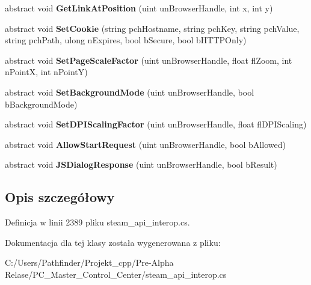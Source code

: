\begin{DoxyCompactItemize}
abstract void {\bfseries Get\+Link\+At\+Position} (uint un\+Browser\+Handle, int x, int y)
\item 
\mbox{\label{class_valve_1_1_steamworks_1_1_i_steam_h_t_m_l_surface_a3cbf4e16e3edc461eab6a73a989d4d03}} 
abstract void {\bfseries Set\+Cookie} (string pch\+Hostname, string pch\+Key, string pch\+Value, string pch\+Path, ulong n\+Expires, bool b\+Secure, bool b\+H\+T\+T\+P\+Only)
\item 
\mbox{\label{class_valve_1_1_steamworks_1_1_i_steam_h_t_m_l_surface_a1ec905c4e7aa9e95a498a4372d2a92e4}} 
abstract void {\bfseries Set\+Page\+Scale\+Factor} (uint un\+Browser\+Handle, float fl\+Zoom, int n\+PointX, int n\+PointY)
\item 
\mbox{\label{class_valve_1_1_steamworks_1_1_i_steam_h_t_m_l_surface_ab6db6bca31171e788dbfe9870fc9d872}} 
abstract void {\bfseries Set\+Background\+Mode} (uint un\+Browser\+Handle, bool b\+Background\+Mode)
\item 
\mbox{\label{class_valve_1_1_steamworks_1_1_i_steam_h_t_m_l_surface_ab1f041135de22d4e4fd697fd8bcbde7f}} 
abstract void {\bfseries Set\+D\+P\+I\+Scaling\+Factor} (uint un\+Browser\+Handle, float fl\+D\+P\+I\+Scaling)
\item 
\mbox{\label{class_valve_1_1_steamworks_1_1_i_steam_h_t_m_l_surface_a4becebabd6f86e5174266759add083bf}} 
abstract void {\bfseries Allow\+Start\+Request} (uint un\+Browser\+Handle, bool b\+Allowed)
\item 
\mbox{\label{class_valve_1_1_steamworks_1_1_i_steam_h_t_m_l_surface_a34e3fd8fc742a1419c15e58e17486789}} 
abstract void {\bfseries J\+S\+Dialog\+Response} (uint un\+Browser\+Handle, bool b\+Result)
\end{DoxyCompactItemize}


\subsection{Opis szczegółowy}


Definicja w linii 2389 pliku steam\+\_\+api\+\_\+interop.\+cs.



Dokumentacja dla tej klasy została wygenerowana z pliku\+:\begin{DoxyCompactItemize}
\item 
C\+:/\+Users/\+Pathfinder/\+Projekt\+\_\+cpp/\+Pre-\/\+Alpha Relase/\+P\+C\+\_\+\+Master\+\_\+\+Control\+\_\+\+Center/steam\+\_\+api\+\_\+interop.\+cs\end{DoxyCompactItemize}
